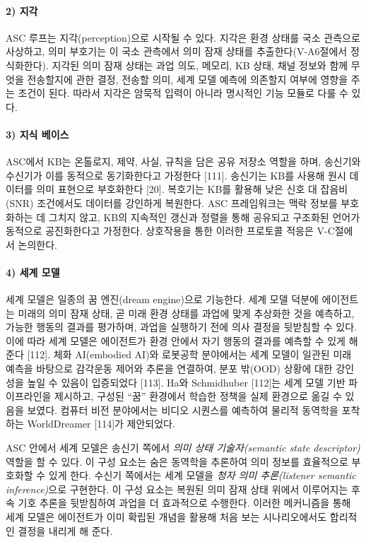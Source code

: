 \paragraph{2) 지각}
ASC 루프는 지각(perception)으로 시작될 수 있다.
지각은 환경 상태를 국소 관측으로 사상하고, 의미 부호기는 이 국소 관측에서 의미 잠재 상태를 추출한다(V-A6절에서 정식화한다).
지각된 의미 잠재 상태는 과업 의도, 메모리, KB 상태, 채널 정보와 함께 무엇을 전송할지에 관한 결정, 전송할 의미, 세계 모델 예측에 의존할지 여부에 영향을 주는 조건이 된다.
따라서 지각은 암묵적 입력이 아니라 명시적인 기능 모듈로 다룰 수 있다.

\paragraph{3) 지식 베이스}
ASC에서 KB는 온톨로지, 제약, 사실, 규칙을 담은 공유 저장소 역할을 하며, 송신기와 수신기가 이를 동적으로 동기화한다고 가정한다 [111].
송신기는 KB를 사용해 원시 데이터를 의미 표현으로 부호화한다 [20].
복호기는 KB를 활용해 낮은 신호 대 잡음비(SNR) 조건에서도 데이터를 강인하게 복원한다.
ASC 프레임워크는 맥락 정보를 부호화하는 데 그치지 않고, KB의 지속적인 갱신과 정렬을 통해 공유되고 구조화된 언어가 동적으로 공진화한다고 가정한다.
상호작용을 통한 이러한 프로토콜 적응은 V-C절에서 논의한다.

\paragraph{4) 세계 모델}
세계 모델은 일종의 꿈 엔진(dream engine)으로 기능한다.
세계 모델 덕분에 에이전트는 미래의 의미 잠재 상태, 곧 미래 환경 상태를 과업에 맞게 추상화한 것을 예측하고, 가능한 행동의 결과를 평가하며, 과업을 실행하기 전에 의사 결정을 뒷받침할 수 있다.
이에 따라 세계 모델은 에이전트가 환경 안에서 자기 행동의 결과를 예측할 수 있게 해 준다 [112].
체화 AI(embodied AI)와 로봇공학 분야에서는 세계 모델이 일관된 미래 예측을 바탕으로 감각운동 제어와 추론을 연결하여, 분포 밖(OOD) 상황에 대한 강인성을 높일 수 있음이 입증되었다 [113].
Ha와 Schmidhuber [112]는 세계 모델 기반 파이프라인을 제시하고, 구성된 ``꿈'' 환경에서 학습한 정책을 실제 환경으로 옮길 수 있음을 보였다.
컴퓨터 비전 분야에서는 비디오 시퀀스를 예측하여 물리적 동역학을 포착하는 WorldDreamer [114]가 제안되었다.

ASC 안에서 세계 모델은 송신기 쪽에서 \textit{의미 상태 기술자(semantic state descriptor)} 역할을 할 수 있다.
이 구성 요소는 숨은 동역학을 추론하여 의미 정보를 효율적으로 부호화할 수 있게 한다.
수신기 쪽에서는 세계 모델을 \textit{청자 의미 추론(listener semantic inference)}으로 구현한다.
이 구성 요소는 복원된 의미 잠재 상태 위에서 이루어지는 후속 기호 추론을 뒷받침하여 과업을 더 효과적으로 수행한다.
이러한 메커니즘을 통해 세계 모델은 에이전트가 이미 확립된 개념을 활용해 처음 보는 시나리오에서도 합리적인 결정을 내리게 해 준다.

